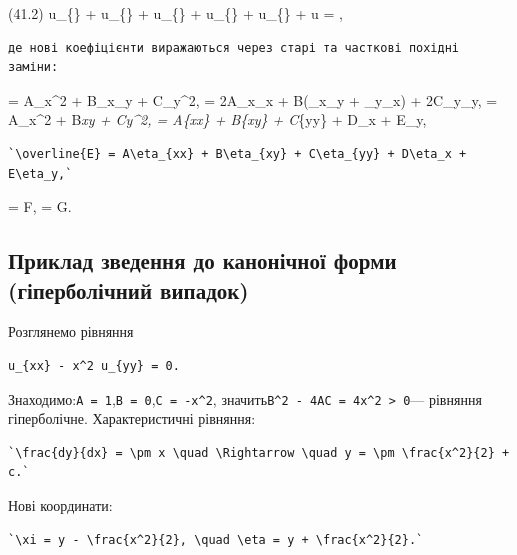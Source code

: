 \documentclass[
  ukrainian,
]{article}
\begin{document}
(41.2)\qquad{} u\_\{\xi\xi\} +  u\_\{\xi\eta\} +
 u\_\{\eta\eta\} +  u\_\{\xi\} + 
u\_\{\eta\} +  u = ,

\begin{verbatim}
де нові коефіцієнти виражаються через старі та часткові похідні заміни:
\end{verbatim}

 = A\xi\_x\^{}2 + B\xi\_x\xi\_y + C\xi\_y\^{}2, 
= 2A\xi\_x\eta\_x + B(\xi\_x\eta\_y + \xi\_y\eta\_x) + 2C\xi\_y\eta\_y,
 = A\eta\_x\^{}2 + B\eta\emph{x\eta\emph{y +
C\eta\emph{y\^{}2,  = A\xi}\{xx\} + B\xi}\{xy\} +
C\xi}\{yy\} + D\xi\_x + E\xi\_y,

\begin{verbatim}
`\overline{E} = A\eta_{xx} + B\eta_{xy} + C\eta_{yy} + D\eta_x + E\eta_y,`
\end{verbatim}

 = F, \quad {} = G.

\subsection{Приклад зведення до канонічної форми (гіперболічний
випадок)}\label{ux43fux440ux438ux43aux43bux430ux434-ux437ux432ux435ux434ux435ux43dux43dux44f-ux434ux43e-ux43aux430ux43dux43eux43dux456ux447ux43dux43eux457-ux444ux43eux440ux43cux438-ux433ux456ux43fux435ux440ux431ux43eux43bux456ux447ux43dux438ux439-ux432ux438ux43fux430ux434ux43eux43a}

Розглянемо рівняння

\begin{verbatim}
u_{xx} - x^2 u_{yy} = 0.
\end{verbatim}

Знаходимо:\texttt{A\ =\ 1},\texttt{B\ =\ 0},\texttt{C\ =\ -x\^{}2},
значить\texttt{B\^{}2\ -\ 4AC\ =\ 4x\^{}2\ \textgreater{}\ 0}---
рівняння гіперболічне. Характеристичні рівняння:

\begin{verbatim}
`\frac{dy}{dx} = \pm x \quad \Rightarrow \quad y = \pm \frac{x^2}{2} + c.`
\end{verbatim}

Нові координати:

\begin{verbatim}
`\xi = y - \frac{x^2}{2}, \quad \eta = y + \frac{x^2}{2}.`
\end{verbatim}
\end{document}
